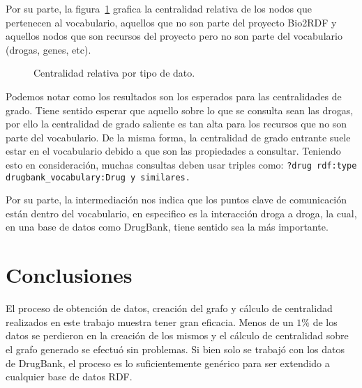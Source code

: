 Por su parte, la figura~\ref{fig:comptype} grafica la centralidad relativa de
los nodos que pertenecen al vocabulario, aquellos que no son parte del proyecto
Bio2RDF y aquellos nodos que son recursos del proyecto pero no son parte del
vocabulario (drogas, genes, etc).
\begin{figure}[h]
  \caption{Centralidad relativa por tipo de dato.}
  \label{fig:comptype}
\end{figure}

Podemos notar como los resultados son los esperados para las centralidades de
grado. Tiene sentido esperar que aquello sobre lo que se consulta sean las
drogas, por ello la centralidad de grado saliente es tan alta para los recursos
que no son parte del vocabulario. De la misma forma, la centralidad de grado
entrante suele estar en el vocabulario debido a que son las propiedades a
consultar. Teniendo esto en consideración, muchas consultas deben usar triples
como: \tt{?drug rdf:type drugbank\_vocabulary:Drug} y similares.

Por su parte, la intermediación nos indica que los puntos clave de comunicación
están dentro del vocabulario, en especifico es la interacción droga a droga, la
cual, en una base de datos como DrugBank, tiene sentido sea la más importante.

\section{Conclusiones}\label{sec:con}
El proceso de obtención de datos, creación del grafo y cálculo de centralidad
realizados en este trabajo muestra tener gran eficacia. Menos de un $1\%$ de los
datos se perdieron en la creación de los mismos y el cálculo de centralidad
sobre el grafo generado se efectuó sin problemas. Si bien solo se trabajó con
los datos de DrugBank, el proceso es lo suficientemente genérico para ser
extendido a cualquier base de datos RDF.

